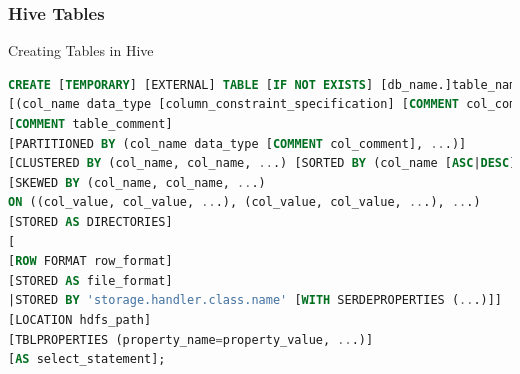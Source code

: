 \subsubsection{Hive Tables}
\begin{frame}[fragile]{Creating Tables in Hive}
\vspace{-.2cm}
\begin{lstlisting}[caption={Create Table Commands},language=SQL]
CREATE [TEMPORARY] [EXTERNAL] TABLE [IF NOT EXISTS] [db_name.]table_name
[(col_name data_type [column_constraint_specification] [COMMENT col_comment], ... [constraint_specification])]
[COMMENT table_comment]
[PARTITIONED BY (col_name data_type [COMMENT col_comment], ...)]
[CLUSTERED BY (col_name, col_name, ...) [SORTED BY (col_name [ASC|DESC], ...)] INTO num_buckets BUCKETS]
[SKEWED BY (col_name, col_name, ...)
ON ((col_value, col_value, ...), (col_value, col_value, ...), ...)
[STORED AS DIRECTORIES]
[
[ROW FORMAT row_format] 
[STORED AS file_format]
|STORED BY 'storage.handler.class.name' [WITH SERDEPROPERTIES (...)]]
[LOCATION hdfs_path]
[TBLPROPERTIES (property_name=property_value, ...)]
[AS select_statement];
\end{lstlisting}

\end{frame}

